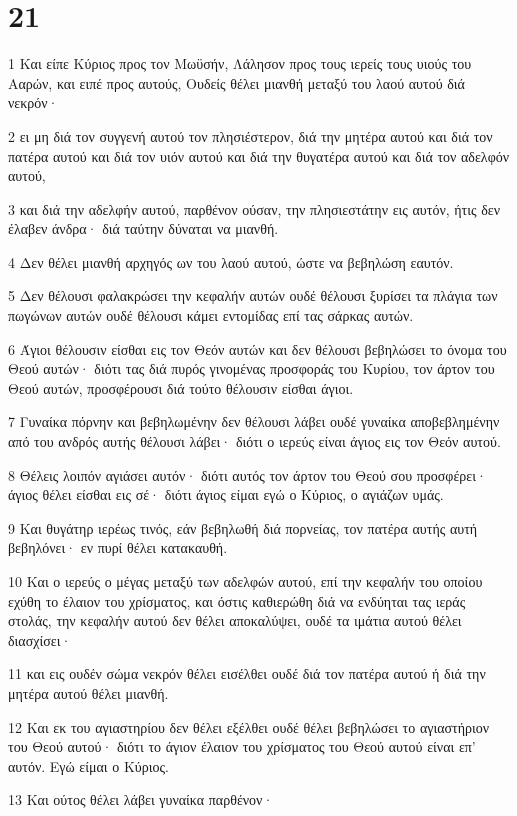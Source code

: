\chapter{21}

\par 1 Και είπε Κύριος προς τον Μωϋσήν, Λάλησον προς τους ιερείς τους υιούς του Ααρών, και ειπέ προς αυτούς, Ουδείς θέλει μιανθή μεταξύ του λαού αυτού διά νεκρόν·
\par 2 ει μη διά τον συγγενή αυτού τον πλησιέστερον, διά την μητέρα αυτού και διά τον πατέρα αυτού και διά τον υιόν αυτού και διά την θυγατέρα αυτού και διά τον αδελφόν αυτού,
\par 3 και διά την αδελφήν αυτού, παρθένον ούσαν, την πλησιεστάτην εις αυτόν, ήτις δεν έλαβεν άνδρα· διά ταύτην δύναται να μιανθή.
\par 4 Δεν θέλει μιανθή αρχηγός ων του λαού αυτού, ώστε να βεβηλώση εαυτόν.
\par 5 Δεν θέλουσι φαλακρώσει την κεφαλήν αυτών ουδέ θέλουσι ξυρίσει τα πλάγια των πωγώνων αυτών ουδέ θέλουσι κάμει εντομίδας επί τας σάρκας αυτών.
\par 6 Άγιοι θέλουσιν είσθαι εις τον Θεόν αυτών και δεν θέλουσι βεβηλώσει το όνομα του Θεού αυτών· διότι τας διά πυρός γινομένας προσφοράς του Κυρίου, τον άρτον του Θεού αυτών, προσφέρουσι διά τούτο θέλουσιν είσθαι άγιοι.
\par 7 Γυναίκα πόρνην και βεβηλωμένην δεν θέλουσι λάβει ουδέ γυναίκα αποβεβλημένην από του ανδρός αυτής θέλουσι λάβει· διότι ο ιερεύς είναι άγιος εις τον Θεόν αυτού.
\par 8 Θέλεις λοιπόν αγιάσει αυτόν· διότι αυτός τον άρτον του Θεού σου προσφέρει· άγιος θέλει είσθαι εις σέ· διότι άγιος είμαι εγώ ο Κύριος, ο αγιάζων υμάς.
\par 9 Και θυγάτηρ ιερέως τινός, εάν βεβηλωθή διά πορνείας, τον πατέρα αυτής αυτή βεβηλόνει· εν πυρί θέλει κατακαυθή.
\par 10 Και ο ιερεύς ο μέγας μεταξύ των αδελφών αυτού, επί την κεφαλήν του οποίου εχύθη το έλαιον του χρίσματος, και όστις καθιερώθη διά να ενδύηται τας ιεράς στολάς, την κεφαλήν αυτού δεν θέλει αποκαλύψει, ουδέ τα ιμάτια αυτού θέλει διασχίσει·
\par 11 και εις ουδέν σώμα νεκρόν θέλει εισέλθει ουδέ διά τον πατέρα αυτού ή διά την μητέρα αυτού θέλει μιανθή.
\par 12 Και εκ του αγιαστηρίου δεν θέλει εξέλθει ουδέ θέλει βεβηλώσει το αγιαστήριον του Θεού αυτού· διότι το άγιον έλαιον του χρίσματος του Θεού αυτού είναι επ' αυτόν. Εγώ είμαι ο Κύριος.
\par 13 Και ούτος θέλει λάβει γυναίκα παρθένον·
